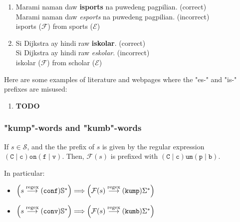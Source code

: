 \begin{enumerate}
      \item Marami naman daw \textbf{isports} na puwedeng pagpilian. (correct) \\
            Marami naman daw \textit{esports} na puwedeng pagpilian. (incorrect) \\
            isports (\(\mathcal{F}\)) from sports (\(\mathcal{E}\))
      \item Si Dijkstra ay hindi raw \textbf{iskolar}. (correct) \\
            Si Dijkstra ay hindi raw \textit{eskolar}. (incorrect) \\
            iskolar (\(\mathcal{F}\)) from scholar (\(\mathcal{E}\))
\end{enumerate}

\begin{example}
      Here are some examples of literature and webpages where the "es-" and "is-"
      prefixes are misused:
\end{example}

\begin{enumerate}
      \item \textbf{TODO}
\end{enumerate}

\subsubsection{"kump"-words and "kumb"-words}

If \(s\in \mathcal{S}\), and the the prefix of \(s\) is given by the
regular expression \((\texttt{C}\mid\texttt{c})\texttt{on}(\texttt{f}\mid\texttt{v})\). Then,
\(\mathcal{F}(s)\) is prefixed with
\((\texttt{C}\mid\texttt{c})\texttt{um}(\texttt{p}\mid\texttt{b})\).

In particular:
\begin{itemize}
      \item \(\left(s \overset{\text{regex}}{\longrightarrow} (\texttt{conf})\mathbb{S}^*\right) \Longrightarrow \left(\mathcal{F}(s) \overset{\text{regex}}{\longrightarrow} (\texttt{kump})\Sigma^*\right)\)
      \item \(\left(s \overset{\text{regex}}{\longrightarrow} (\texttt{conv})\mathbb{S}^*\right) \Longrightarrow \left(\mathcal{F}(s) \overset{\text{regex}}{\longrightarrow} (\texttt{kumb})\Sigma^*\right)\)
\end{itemize}

